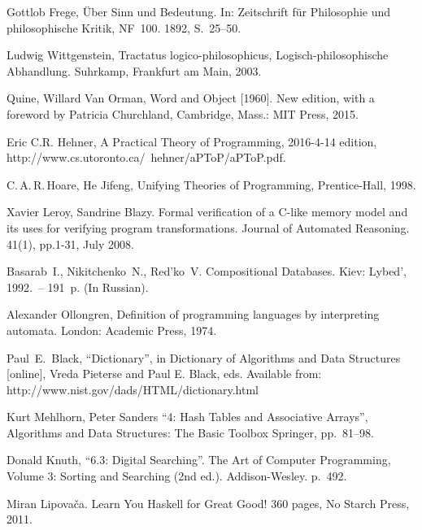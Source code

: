 \documentclass{article}
\theoremstyle{definition}
\begin{document}
\begin{thebibliography}{00}

  Gottlob Frege,
  \"Uber Sinn und Bedeutung.
  In: Zeitschrift f\"ur Philosophie und philosophische Kritik,
  NF~100. 1892, S.~25--50.

  Ludwig Wittgenstein,
  Tractatus logico-philosophicus, Logisch-phi\-lo\-so\-phi\-sche Abhandlung.
  Suhrkamp,
  Frankfurt am Main,
  2003.

  Quine, Willard Van Orman,
  Word and Object [1960].
  New edition, with a foreword by Patricia Churchland,
  Cambridge,
  Mass.: MIT Press,
  2015.

  Eric C.R. Hehner,
  A Practical Theory of Programming,
  2016-4-14 edition,
  http://www.cs.utoronto.ca/~hehner/aPToP/aPToP.pdf.

  C.\,A.\,R.\,Hoare, He Jifeng,
  Unifying Theories of Programming,
  Prentice-Hall,
  1998.

  Xavier Leroy, Sandrine Blazy.
  Formal verification of a C-like memory model and its uses for verifying program transformations.
  Journal of Automated Reasoning.
  41(1), pp.1-31, July 2008.

  Basarab~I., Nikitchenko~N., Red’ko~V.
  Compositional Databases.
  Kiev: Lybed’, 1992.~-- 191~p. (In Russian).

  Alexander Ollongren,
  Definition of programming languages by interpreting automata.
  London: Academic Press,
  1974.

  Paul~E.~Black,
  ``Dictionary'', in Dictionary of Algorithms and Data Structures [online],
  Vreda Pieterse and Paul E. Black, eds.
  Available from: http://www.nist.gov/dads/HTML/dictionary.html

  Kurt Mehlhorn, Peter Sanders
  ``4: Hash Tables and Associative Arrays'',
  Algorithms and Data Structures: The Basic Toolbox
  Springer, pp.~81--98.

  Donald Knuth,
  ``6.3: Digital Searching''.
  The Art of Computer Programming,
  Volume 3: Sorting and Searching (2nd ed.).
  Addison-Wesley. p.~492.


  Miran Lipova\v{c}a.
  Learn You Haskell for Great Good!
  360 pages,
  No Starch Press,
  2011.

\end{thebibliography}
\end{document}

